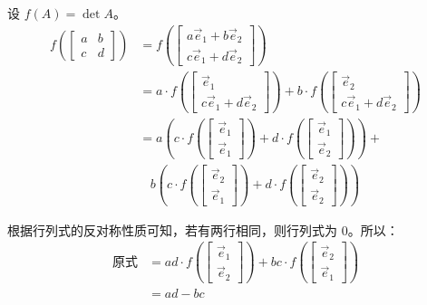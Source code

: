 \begin{solve}
	设 $f(A) = \det A$。
	$$
	\begin{aligned}
		f \left( \begin{bmatrix}a&b\\c&d\end{bmatrix} \right) &= f \left( \begin{bmatrix}a\vec e_1 + b\vec e_2\\c\vec e_1 + d\vec e_2\end{bmatrix} \right)
		\\&= a \cdot f \left( \begin{bmatrix}\vec e_1\\c\vec e_1 + d\vec e_2\end{bmatrix} \right) + b \cdot f \left( \begin{bmatrix}\vec e_2\\c\vec e_1 + d\vec e_2\end{bmatrix} \right)
		\\&= a\left(c \cdot f \left( \begin{bmatrix}\vec e_1\\\vec e_1\end{bmatrix} \right) +
		d \cdot f \left( \begin{bmatrix}\vec e_1\\\vec e_2\end{bmatrix} \right) \right) +
		\\&~~~~
		b\left(c \cdot f \left( \begin{bmatrix}\vec e_2\\\vec e_1\end{bmatrix} \right) +
		d \cdot f \left( \begin{bmatrix}\vec e_2\\\vec e_2\end{bmatrix} \right) \right)
	\end{aligned}
	$$

	根据行列式的反对称性质可知，若有两行相同，则行列式为 $0$。所以：
	$$
	\begin{aligned}
		\text{原式} &= ad \cdot f \left( \begin{bmatrix}\vec e_1\\\vec e_2\end{bmatrix} \right) + bc \cdot f \left( \begin{bmatrix}\vec e_2\\\vec e_1\end{bmatrix} \right)
		\\&=
		ad - bc
	\end{aligned}
	$$
\end{solve}

